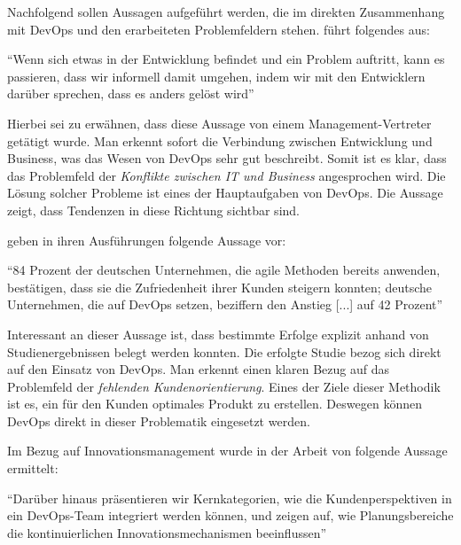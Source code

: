Nachfolgend sollen Aussagen aufgeführt werden, die  im direkten Zusammenhang mit DevOps und den erarbeiteten Problemfeldern stehen.  führt folgendes aus:

\begin{center}
	``Wenn sich etwas in der Entwicklung befindet und ein Problem auftritt, kann es passieren, dass wir informell damit umgehen, indem wir mit den Entwicklern darüber sprechen, dass es anders gelöst wird'' \cite[S. 6]{mikalsen_agile_2018}
\end{center}

Hierbei sei zu erwähnen, dass diese Aussage von einem Management-Vertreter getätigt wurde. Man erkennt sofort die Verbindung zwischen Entwicklung und Business, was das Wesen von DevOps sehr gut beschreibt. Somit ist es klar, dass das Problemfeld der \textit{Konflikte zwischen IT und Business} angesprochen wird. Die Lösung solcher Probleme ist eines der Hauptaufgaben von DevOps. Die Aussage zeigt, dass Tendenzen in diese Richtung sichtbar sind.

 geben in ihren Ausführungen folgende Aussage vor:

\begin{center}
	``84 Prozent der deutschen Unternehmen, die agile Methoden bereits anwenden, bestätigen, dass sie die Zufriedenheit ihrer Kunden steigern konnten; deutsche Unternehmen, die auf DevOps setzen, beziffern den Anstieg [...] auf 42 Prozent'' \cite{drilling_agilitat_nodate}
\end{center}

Interessant an dieser Aussage ist, dass bestimmte Erfolge explizit anhand von Studienergebnissen belegt werden konnten. Die erfolgte Studie bezog sich direkt auf den Einsatz  von DevOps. Man erkennt einen klaren Bezug auf das Problemfeld der \textit{fehlenden Kundenorientierung}. Eines der Ziele dieser Methodik ist es, ein für den Kunden optimales Produkt zu erstellen. Deswegen können DevOps direkt in dieser Problematik eingesetzt werden.

Im Bezug auf Innovationsmanagement wurde in der Arbeit von  folgende Aussage ermittelt:

\begin{center}
	``Darüber hinaus präsentieren wir Kernkategorien, wie die Kundenperspektiven in ein DevOps-Team integriert werden können, und zeigen auf, wie Planungsbereiche die kontinuierlichen Innovationsmechanismen beeinflussen'' \cite[S. 1]{wiedemann_implementing_2019} 
\end{center}

